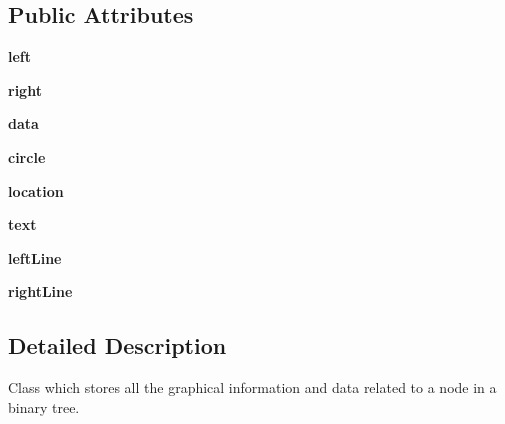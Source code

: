 \subsection*{Public Attributes}
\begin{DoxyCompactItemize}
\item 
\mbox{\label{class_binary_search_tree_1_1_binary_tree_node_a2a7329ecef9597b0639d5e56d1fb9e98}} 
{\bfseries left}
\item 
\mbox{\label{class_binary_search_tree_1_1_binary_tree_node_a8ec787cb980f443ef91e36adbc07f03b}} 
{\bfseries right}
\item 
\mbox{\label{class_binary_search_tree_1_1_binary_tree_node_a7dc751865b03d93d7a2eaf8e0453021f}} 
{\bfseries data}
\item 
\mbox{\label{class_binary_search_tree_1_1_binary_tree_node_a06a5a777f647a7fd179e98e6908fb7c9}} 
{\bfseries circle}
\item 
\mbox{\label{class_binary_search_tree_1_1_binary_tree_node_a5105a9ac24008de97b2243aa8ceb9566}} 
{\bfseries location}
\item 
\mbox{\label{class_binary_search_tree_1_1_binary_tree_node_acc17cecd9513b2d26b8b1c777d72407f}} 
{\bfseries text}
\item 
\mbox{\label{class_binary_search_tree_1_1_binary_tree_node_abef335231af642d070f64122033f2ff7}} 
{\bfseries left\+Line}
\item 
\mbox{\label{class_binary_search_tree_1_1_binary_tree_node_a2fb1088533007be5718735e39080f6c9}} 
{\bfseries right\+Line}
\end{DoxyCompactItemize}


\subsection{Detailed Description}
Class which stores all the graphical information and data related to a node in a binary tree. 

